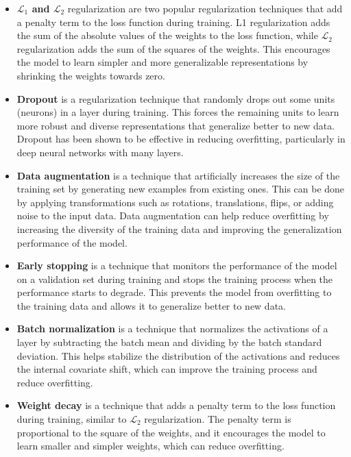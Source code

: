 \begin{itemize}
	
	\item \textbf{$\mathcal{L}_1$ and $\mathcal{L}_2$} regularization are two popular regularization techniques that add a penalty term to the loss function during training. L1 regularization adds the sum of the absolute values of the weights to the loss function, while $\mathcal{L}_2$ regularization adds the sum of the squares of the weights. This encourages the model to learn simpler and more generalizable representations by shrinking the weights towards zero.
	
	\item \textbf{Dropout} is a regularization technique that randomly drops out some units (neurons) in a layer during training. This forces the remaining units to learn more robust and diverse representations that generalize better to new data. Dropout has been shown to be effective in reducing overfitting, particularly in deep neural networks with many layers.
	
	\item \textbf{Data augmentation} is a technique that artificially increases the size of the training set by generating new examples from existing ones. This can be done by applying transformations such as rotations, translations, flips, or adding noise to the input data. Data augmentation can help reduce overfitting by increasing the diversity of the training data and improving the generalization performance of the model.
	
	\item \textbf{Early stopping} is a technique that monitors the performance of the model on a validation set during training and stops the training process when the performance starts to degrade. This prevents the model from overfitting to the training data and allows it to generalize better to new data.
	
	\item \textbf{Batch normalization} is a technique that normalizes the activations of a layer by subtracting the batch mean and dividing by the batch standard deviation. This helps stabilize the distribution of the activations and reduces the internal covariate shift, which can improve the training process and reduce overfitting.
	
	\item \textbf{Weight decay} is a technique that adds a penalty term to the loss function during training, similar to $\mathcal{L}_2$ regularization. The penalty term is proportional to the square of the weights, and it encourages the model to learn smaller and simpler weights, which can reduce overfitting.
	
\end{itemize}

